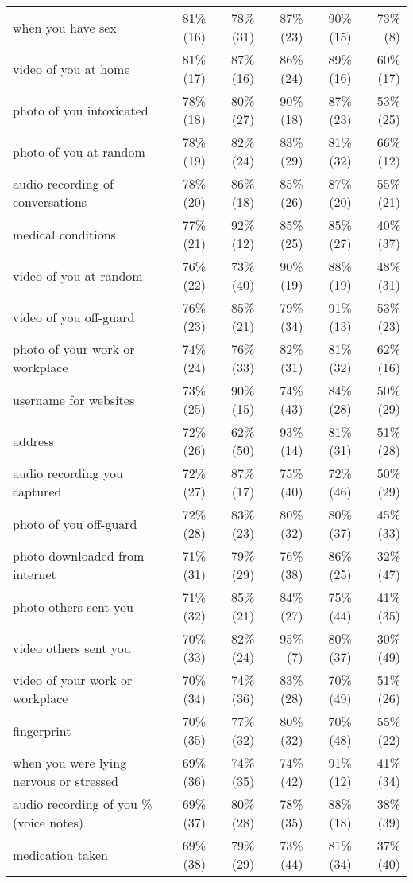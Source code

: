 \begin{table*}[t]
\begin{center}
\begin{tabular}{| l | r | r | r | r | r |}
when you have sex & 81\% (16) & 78\% (31) & 87\% (23) & 90\% (15) & 73\% (8) \\ 
video of you at home & 81\% (17) & 87\% (16) & 86\% (24) & 89\% (16) & 60\% (17) \\ 
photo of you intoxicated & 78\% (18) & 80\% (27) & 90\% (18) & 87\% (23) & 53\% (25) \\ 
photo of you at random  & 78\% (19) & 82\% (24) & 83\% (29) & 81\% (32) & 66\% (12) \\ 
audio recording of conversations & 78\% (20) & 86\% (18) & 85\% (26) & 87\% (20) & 55\% (21) \\ 
medical conditions & 77\% (21) & 92\% (12) & 85\% (25) & 85\% (27) & 40\% (37) \\ 
video of you at random & 76\% (22) & 73\% (40) & 90\% (19) & 88\% (19) & 48\% (31) \\ 
video of you off-guard & 76\% (23) & 85\% (21) & 79\% (34) & 91\% (13) & 53\% (23) \\ 
photo of your work or workplace & 74\% (24) & 76\% (33) & 82\% (31) & 81\% (32) & 62\% (16) \\ 
username for websites & 73\% (25) & 90\% (15) & 74\% (43) & 84\% (28) & 50\% (29) \\ 
address & 72\% (26) & 62\% (50) & 93\% (14) & 81\% (31) & 51\% (28) \\ 
audio recording you captured & 72\% (27) & 87\% (17) & 75\% (40) & 72\% (46) & 50\% (29) \\ 
photo of you off-guard & 72\% (28) & 83\% (23) & 80\% (32) & 80\% (37) & 45\% (33) \\ 
photo downloaded from internet & 71\% (31) & 79\% (29) & 76\% (38) & 86\% (25) & 32\% (47) \\ 
photo others sent you & 71\% (32) & 85\% (21) & 84\% (27) & 75\% (44) & 41\% (35) \\ 
video others sent you & 70\% (33) & 82\% (24) & 95\% (7) & 80\% (37) & 30\% (49) \\ 
video of your work or workplace & 70\% (34) & 74\% (36) & 83\% (28) & 70\% (49) & 51\% (26) \\ 
fingerprint & 70\% (35) & 77\% (32) & 80\% (32) & 70\% (48) & 55\% (22) \\ 
when you were lying nervous or stressed & 69\% (36) & 74\% (35) & 74\% (42) & 91\% (12) & 41\% (34) \\ 
audio recording of you \% (voice notes) & 69\% (37) & 80\% (28) & 78\% (35) & 88\% (18) & 38\% (39) \\ 
medication taken & 69\% (38) & 79\% (29) & 73\% (44) & 81\% (34) & 37\% (40) \\ 

\end{tabular}
\end{center}
\end{table*}
